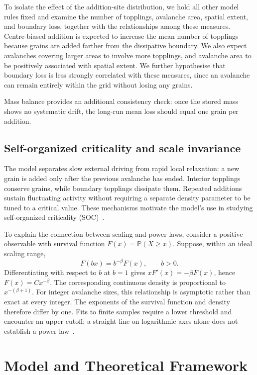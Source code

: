 \documentclass[11pt,a4paper,oneside]{report}
\newcommand{\Prob}{\mathbb{P}}
\numberwithin{equation}{chapter}
\begin{document}
To isolate the effect of the addition-site distribution, we hold all other model rules fixed and examine the number of topplings, avalanche area, spatial extent, and boundary loss, together with the relationships among these measures. Centre-biased addition is expected to increase the mean number of topplings because grains are added farther from the dissipative boundary. We also expect avalanches covering larger areas to involve more topplings, and avalanche area to be positively associated with spatial extent. We further hypothesise that boundary loss is less strongly correlated with these measures, since an avalanche can remain entirely within the grid without losing any grains.

Mass balance provides an additional consistency check: once the stored mass shows no systematic drift, the long-run mean loss should equal one grain per addition.

\section{Self-organized criticality and scale invariance}
\label{sec:scaling}
The model separates slow external driving from rapid local relaxation: a new grain is added only after the previous avalanche has ended. Interior topplings conserve grains, while boundary topplings dissipate them. Repeated additions sustain fluctuating activity without requiring a separate density parameter to be tuned to a critical value. These mechanisms motivate the model's use in studying self-organized criticality (SOC)~\cite{bak1987,bak1988,dhar1999}.

To explain the connection between scaling and power laws, consider a positive observable with survival function $F(x)=\Prob(X\geq x)$. Suppose, within an ideal scaling range,
\begin{equation}
 F(bx)=b^{-\beta}F(x),\qquad b>0.
\end{equation}
Differentiating with respect to $b$ at $b=1$ gives $xF'(x)=-\beta F(x)$, hence $F(x)=Cx^{-\beta}$. The corresponding continuous density is proportional to $x^{-(\beta+1)}$. For integer avalanche sizes, this relationship is asymptotic rather than exact at every integer. The exponents of the survival function and density therefore differ by one. Fits to finite samples require a lower threshold and encounter an upper cutoff; a straight line on logarithmic axes alone does not establish a power law~\cite{clauset2009}.

\chapter{Model and Theoretical Framework}
\label{ch:theory}
\end{document}
